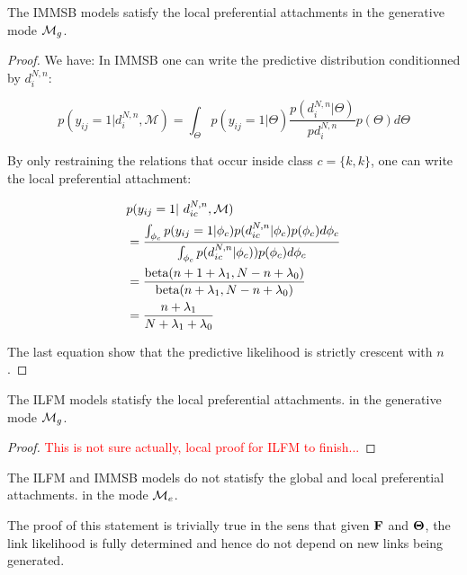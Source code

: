 \begin{proposition}
	The IMMSB models satisfy the local preferential attachments in the generative mode $\mathcal{M}_g$.
\end{proposition}

\begin{proof}
We have:
In IMMSB one can write the predictive distribution conditionned by $d_i^{N,n}$:

\begin{equation} 
p(y_{ij} = 1 | d_i^{N,n}, \mathcal{M}) = \int_{\Theta} p(y_{ij}=1|\Theta) \frac{p(d_i^{N,n} | \Theta)}{pd_i^{N,n}} p(\Theta) d\Theta \nonumber
\end{equation}

By only restraining the relations that occur inside class $c=\{k,k\}$, one can write the local preferential attachment:

\begin{align*} \label{eq:sum}
&p(y_{ij} = 1 | d_{ic}^{N,n}, \mathcal{M})  \\
&=  \frac{ \int_{\phi_{c}} p(y_{ij}=1|\phi_{c}) p(d_{ic}^{N,n} | \phi_{c}) p(\phi_{c}) d\phi_{c}}{\int_{\phi_{c}} \p(d_{ic}^{N,n} | \phi_{c}))       p(\phi_{c}) d\phi_{c}}   \\
&= \frac{ \text{beta}(n+1+\lambda_1, N-n+\lambda_0) }{\text{beta}(n+\lambda_1, N-n+\lambda_0)} \\
&= \frac{n+\lambda_1}{N + \lambda_1 +\lambda_0}
\end{align*}

The last equation show that the predictive likelihood is strictly crescent with $n$.


\end{proof}

\begin{proposition}
	The ILFM models statisfy the local preferential attachments. in the generative mode $\mathcal{M}_g$.
\end{proposition}
\begin{proof}
	\textcolor{red}{This is not sure actually, local proof for ILFM to finish...}
\end{proof}

\begin{proposition}
	The ILFM and IMMSB models do not statisfy the global and local preferential attachments. in the mode $\mathcal{M}_e$.
\end{proposition}

The proof of this statement is trivially true in the sens that given $\mathbf{F}$ and $\mathbf{\Theta}$, the link likelihood is fully determined and hence do not depend on new links being generated. 

